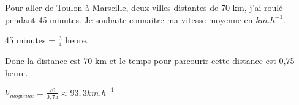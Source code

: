\begin{Ex}
Pour aller de Toulon à Marseille, deux villes distantes de 70 km, j'ai roulé pendant 45 minutes. Je souhaite connaitre ma vitesse moyenne en $km.h^{-1}$.

45 minutes  = $\frac{3}{4}$ heure. 

Donc la distance est 70 km et le temps pour parcourir cette distance est 0,75 heure.

$ V_{moyenne}= \frac{70}{0,75} \approx 93,3 km.h^{-1}$
\end{Ex}

